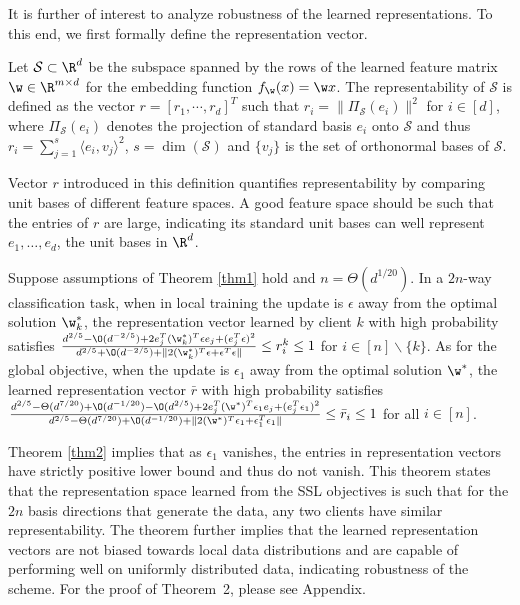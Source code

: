 It is further of interest to analyze robustness of the learned representations. To this end, we first formally define the representation vector.
\begin{definition}\cite{wang2022does}
    Let $\mathcal{S} \subset \R^d$ be the subspace spanned by the rows of the learned feature matrix $\w \in \R^{m \times d}$ for the embedding function $f_{\w}(x) = \w x$. The representability of $\mathcal{S}$ is defined as the vector $r = [r_1, \cdots, r_d]^T$ such that $r_i = \|\Pi_{\mathcal{S}}(e_i) \|^2$ for $i \in [d]$, where $\Pi_{\mathcal{S}}(e_i) $ denotes the projection of standard basis $e_i$ onto $\mathcal{S}$ and thus $r_i = \sum_{j=1}^s\langle e_i, v_j \rangle^2$, $s = \dim(\mathcal{S})$ and $\{v_j \}$ is the set of orthonormal bases of $\mathcal{S}$.
\end{definition}

Vector $r$ introduced in this definition quantifies representability by comparing unit bases of different feature spaces. A good feature space should be such that the entries of $r$ are large, indicating its standard unit bases can well represent $e_1, \dots, e_d$, the unit bases in $\R^d$. 

\begin{theorem}\label{thm2}
Suppose assumptions of Theorem \ref{thm1} hold and $n = \Theta(d^{1/20})$. In a $2n$-way classification task, when in local training the update is $\epsilon$ away from the optimal solution $\w_k^*$, the representation vector learned by client $k$ with high probability satisfies $ \frac{d^{2/5} - \O(d^{-2/5}) + 2e_j^T (\w_k^*)^T \epsilon e_j + (e_j^T \epsilon)^2}{d^{2/5} + \O(d^{-2/5}) + \|2(\w_k^*)^T \epsilon + \epsilon^T \epsilon  \|} \leq r_{i}^k \leq 1$ for $i \in [n]\backslash \{k \}$. As for the global objective, when the update is $\epsilon_1$ away from the optimal solution $\w^*$, the learned representation vector $\bar{r}$ with high probability satisfies $\frac{d^{2/5} - \Theta(d^{7/20}) + \O(d^{-1/20}) - \O(d^{2/5}) + 2e_j^T (\w^*)^T \epsilon_1 e_j + (e_j^T \epsilon_1)^2 }{d^{2/5} - \Theta(d^{7/20}) + \O(d^{-1/20}) + \|2(\w^*)^T \epsilon_1 + \epsilon_1^T \epsilon_1  \|} \leq \bar{r}_i \leq 1$ for all $i \in [n]$. 
\end{theorem}

Theorem \ref{thm2} implies that as $\epsilon_1$ vanishes, the entries in representation vectors have strictly positive lower bound and thus do not vanish. This theorem states that the representation space learned from the SSL objectives is such that for the $2n$ basis directions that generate the data, any two clients have similar representability.
The theorem further implies that the learned representation vectors are not biased towards local data distributions and are capable of performing well on uniformly distributed data, indicating robustness of the scheme. 
For the proof of Theorem~2, please see Appendix.



